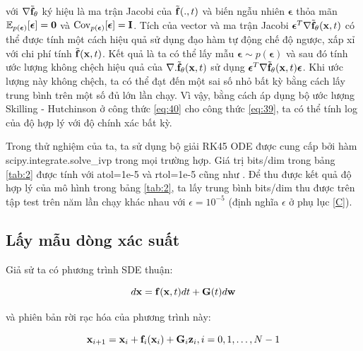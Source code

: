 \documentclass{article} %
\begin{document}
với $\nabla \tilde{\bold{f}}_{\bold{\theta}}$ ký hiệu là ma trận Jacobi của $\tilde{\bold{f}}(., t)$ và biến ngẫu nhiên $\boldsymbol{\epsilon}$ thỏa mãn $\mathbb{E}_{p(\boldsymbol{\epsilon})} \lbrack \boldsymbol{\epsilon} \rbrack = \bold{0}$ và $\mathrm{Cov}_{p(\boldsymbol{\epsilon})} \lbrack \boldsymbol{\epsilon} \rbrack = \bold{I}$.
Tích của vector và ma trận Jacobi $\boldsymbol{\epsilon}^T \nabla \tilde{\bold{f}}_{\bold{\theta}}(\bold{x}, t)$ có thể được tính một cách hiệu quả sử dụng đạo hàm tự động chế độ ngược, xấp xỉ với chi phí tính $\tilde{\bold{f}}(\bold{x}, t)$.
Kết quả là ta có thể lấy mẫu $\boldsymbol{\epsilon} \sim p(\boldsymbol{\epsilon})$ và sau đó tính ước lượng không chệch hiệu quả của $\nabla . \tilde{\bold{f}}_{\bold{\theta}}(\bold{x}, t)$ sử dụng $\boldsymbol{\epsilon}^T \nabla \tilde{\bold{f}}_{\bold{\theta}} (\bold{x}, t) \boldsymbol{\epsilon}$.
Khi ước lượng này không chệch, ta có thể đạt đến một sai số nhỏ bất kỳ bằng cách lấy trung bình trên một số đủ lớn lần chạy.
Vì vậy, bằng cách áp dụng bộ ước lượng Skilling - Hutchinson ở công thức \ref{eq:40} cho công thức \ref{eq:39}, ta có thể tính log của độ hợp lý với độ chính xác bất kỳ.

Trong thử nghiệm của ta, ta sử dụng bộ giải RK45 ODE \citep{dormand1980family} được cung cấp bởi hàm scipy.integrate.solve\_ivp trong mọi trường hợp.
Giá trị bits/dim trong bảng \ref{tab:2} được tính với atol=1e-5 và rtol=1e-5 cũng như \citep{grathwohl2018ffjord}.
Để thu được kết quả độ hợp lý của mô hình trong bảng \ref{tab:2}, ta lấy trung bình bits/dim thu được trên tập test trên năm lần chạy khác nhau với $\epsilon=10^{-5}$ (định nghĩa $\epsilon$ ở phụ lục \ref{C}).

\subsection{Lấy mẫu dòng xác suất} \label{D.3}

Giả sử ta có phương trình SDE thuận:

\begin{equation*}
    d \bold{x} = \bold{f}(\bold{x}, t) d t + \bold{G}(t) d \bold{w}
\end{equation*}

và phiên bản rời rạc hóa của phương trình này:

\begin{equation} \label{eq:41}
    \bold{x}_{i+1} = \bold{x}_i + \bold{f}_i(\bold{x}_i) + \bold{G}_i \bold{z}_i, i = 0, 1, \dots, N - 1
\end{equation}
\end{document}
